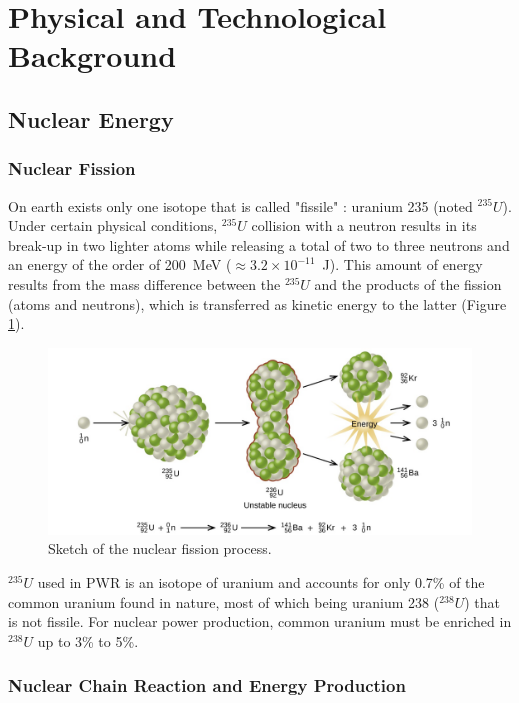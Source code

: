 


\section*{Physical and Technological Background}

\subsection*{Nuclear Energy}

\subsubsection*{Nuclear Fission}

On earth exists only one isotope that is called "fissile" : uranium 235 (noted $^{235}U$). Under certain physical conditions, $^{235}U$ collision with a neutron results in its break-up in two lighter atoms while releasing a total of two to three neutrons and an energy of the order of 200~MeV ($\approx 3.2 \times 10^{-11}$\ J). This amount of energy results from the mass difference between the $^{235}U$ and the products of the fission (atoms and neutrons), which is transferred as kinetic energy to the latter (Figure \ref{fig:fission}).



\begin{figure}[!h]
\centering
\includegraphics[width=0.6\linewidth]{img/intro/fission.jpg}
\caption{Sketch of the nuclear fission process. \cite{chem_libretext }}
\label{fig:fission}
\end{figure}


$^{235}U$ used in PWR is an isotope of uranium and accounts for only 0.7\% of the common uranium found in nature, most of which being uranium 238 ($^{238}U$) that is not fissile. For nuclear power production, common uranium must be enriched in $^{238}U$ up to 3\% to 5\%.

\subsubsection*{Nuclear Chain Reaction and Energy Production}


